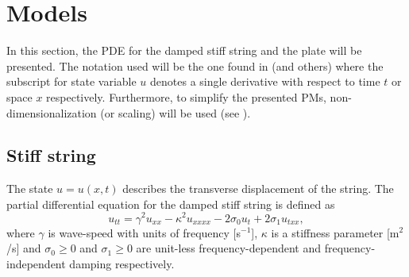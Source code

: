 \documentclass{article}
\begin{document}
\section{Models}\label{sec:PDE}
In this section, the PDE for the damped stiff string and the plate will be presented. The notation used will be the one found in \cite{Bilbao2009:NumericalSoundSynthesis} (and others) where the subscript for state variable $u$ denotes a single derivative with respect to time $t$ or space $x$ respectively. Furthermore, to simplify the presented PMs, non-dimensionalization (or scaling) will be used (see \cite{Bilbao2009:NumericalSoundSynthesis}). 


\subsection{Stiff string}\label{subsec:stiffStringPDE}
The state $u = u(x,t)$ describes the transverse displacement of the string. The partial differential equation for the damped stiff string is defined as \cite{Bilbao2009:NumericalSoundSynthesis} 
\begin{equation}\label{eq:stiffString}
    u_{tt} = \gamma^2 u_{xx}-\kappa^2u_{xxxx} - 2\sigma_0u_{t} + 2\sigma_1u_{txx},
\end{equation}
where $\gamma$ is wave-speed with units of frequency [s$^{-1}$], $\kappa$ is a stiffness parameter [m$^2$/s]
and $\sigma_0 \geq 0$ and $\sigma_1 \geq 0$ are unit-less frequency-dependent and frequency-independent damping respectively.
\end{document}
